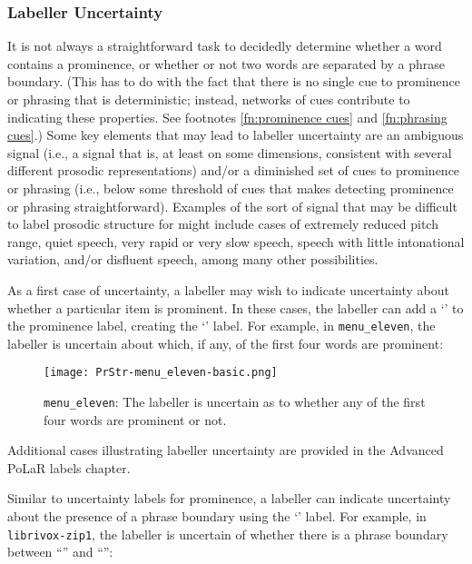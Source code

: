 \subsubsection{Labeller Uncertainty}\label{sec:labeller-uncertainty}

It is not always a straightforward task to decidedly determine whether a word contains a prominence, or whether or not two words are separated by a phrase boundary. (This has to do with the fact that there is no single cue to prominence or phrasing that is deterministic; instead, networks of cues contribute to indicating these properties. See footnotes \ref{fn:prominence cues} and \ref{fn:phrasing cues}.) Some key elements that may lead to labeller uncertainty are an ambiguous signal (i.e., a signal that is, at least on some dimensions, consistent with several different prosodic representations) and/or a diminished set of cues to prominence or phrasing (i.e., below some threshold of cues that makes detecting prominence or phrasing straightforward). Examples of the sort of signal that may be difficult to label prosodic structure for might include cases of extremely reduced pitch range, quiet speech, very rapid or very slow speech, speech with little intonational variation, and/or disfluent speech, among many other possibilities.

As a first case of uncertainty, a labeller may wish to indicate uncertainty about whether a particular item is prominent. In these cases, the labeller can add a ‘’ to the prominence label, creating the ‘’ label. For example, in \texttt{menu\_eleven}, the labeller is uncertain about which, if any, of the first four words are prominent:

\begin{figure}[H]
\centering
%
\texttt{[image: PrStr-menu\_eleven-basic.png]}
%
\caption{\texttt{menu\_eleven}: The labeller is uncertain as to whether any of the first four words are prominent or not.%
\label{fig:menu eleven PrStr uncertainty}%
}
\end{figure}

Additional cases illustrating labeller uncertainty are provided in the Advanced PoLaR labels chapter.

Similar to uncertainty labels for prominence, a labeller can indicate uncertainty about the presence of a phrase boundary using the ‘\textlabel{?]}’ label. For example, in \texttt{librivox-zip1}, the labeller is uncertain of whether there is a phrase boundary between “” and “”:

